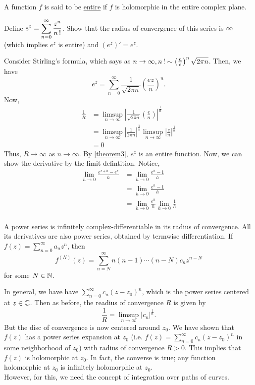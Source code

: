 \documentclass[11pt]{article}
\begin{document}
\begin{definition}
	A function $f$ is said to be \underline{entire} if $f$ is holomorphic in the
	entire complex plane.
\end{definition}
\begin{example}
	Define $\displaystyle e^z = \sum^\infty_{n=0}\frac{z^n}{n\operatorname{!} }$. Show that
	the radius of convergence of this series is $\infty$ (which implies $e^z$ is
	entire) and $(e^z)' = e^z$.
\end{example}
Consider Stirling's formula, which says as $n\to\infty, n\operatorname{!} \sim
\left(\frac{n}{e}\right)^n\sqrt{2\pi n}$. Then, we have
\begin{equation*}
	e^z = \sum^\infty_{n=0} \frac{1}{\sqrt{2\pi n}}\left( \frac{ez}{n}\right)^n.
\end{equation*}
Now,
\begin{align*}
	\frac{1}{R}
	&= \limsup_{n\to\infty}\left| \frac{1}{\sqrt{2\pi
n}}\left(\frac{e}{n}\right)\right|^{\frac{1}{n}}\\
&= \limsup_{n\to\infty}\left| \frac{1}{2\pi n} \right|^{\frac{1}{n}}
\limsup_{n\to\infty}\left| \frac{e}{n} \right|^{\frac{1}{n}}\\
&= 0
\end{align*}
Thus, $R \to \infty$ as $n \to \infty$. By \cref{theorem3}, $e^z$ is an entire
function. Now, we can show the derivative by the limit defintition. Notice,
\begin{align*}
	\lim_{h \to 0}\frac{e^{z+h}-e^z}{h}
	&= \lim_{h \to 0}\frac{e^{h}-1}{h}\\
	&= \lim_{h \to 0}\frac{e^{h}-1}{h}\\
	&= \lim_{h \to 0}\frac{e^{h}}{h}\lim_{h \to 0}\frac{1}{h}\\
\end{align*}

\begin{corollary}
	A power series is infinitely complex-differentiable in its radius of
	convergence. All its derivatives are also power series, obtained by termwise
	differentiation. If $\displaystyle f(z) = \sum^\infty_{n=0}a_nz^n$, then
	\begin{equation*}
		f^{(N)}(z) = \sum^\infty_{n=N}n(n-1)\cdots(n-N)c_nz^{n-N}
	\end{equation*}
	for some $N \in \mathbb{N}$.
\end{corollary}
In general, we have have $\displaystyle \sum^\infty_{n=0} c_n(z-z_0)^n$, which
is the power series centered at $z \in \mathbb{C}$. Then as before, the readius of
convergence $R$ is given by
\begin{equation*}
	\frac{1}{R} = \limsup_{n\to\infty} |c_n|^{\frac{1}{n}}.
\end{equation*}
But the disc of convergence is now centered around $z_0$. We have shown that
$f(z)$ has a power series expansion at $z_0$ (i.e. $\displaystyle f(z) =
\sum^\infty_{n=0}c_n(z-z_0)^n$ in some neighborhood of $z_0$) with radius of
convergence $R > 0$. This implies that $f(z)$ is holomorphic at $z_0$. In fact,
the converse is true; any function holomorphic at $z_0$ is infinitely
holomorphic at $z_0$.\\
However, for this, we need the concept of integration over paths of curves.
\end{document}

